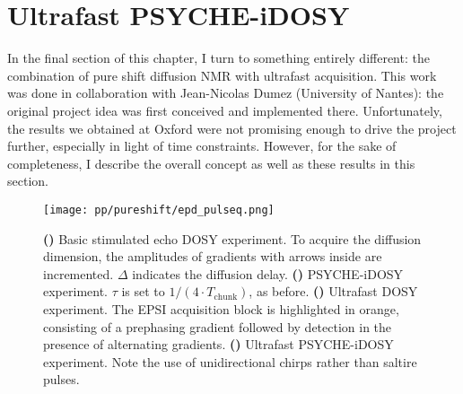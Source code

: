\section{Ultrafast PSYCHE-iDOSY}
\label{sec:pureshift__epsidosy}

In the final section of this chapter, I turn to something entirely different: the combination of pure shift diffusion NMR with ultrafast acquisition.
This work was done in collaboration with Jean-Nicolas Dumez (University of Nantes): the original project idea was first conceived and implemented there.
Unfortunately, the results we obtained at Oxford were not promising enough to drive the project further, especially in light of time constraints.
However, for the sake of completeness, I describe the overall concept as well as these results in this section.

\begin{figure}[htb]
    \centering
    \texttt{[image: pp/pureshift/epd\_pulseq.png]}%
    {\label{fig:epd_pulseq_stedosy}}%
    {\label{fig:epd_pulseq_psychedosy}}%
    {\label{fig:epd_pulseq_epsidosy}}%
    {\label{fig:epd_pulseq_epsipsychedosy}}%
    \caption[EPSI PSYCHE-iDOSY and associated pulse sequences]{
        \textbf{()} Basic stimulated echo DOSY experiment.
        To acquire the diffusion dimension, the amplitudes of gradients with arrows inside are incremented.
        $\Delta$ indicates the diffusion delay.
        \textbf{()} PSYCHE-iDOSY experiment. $\tau$ is set to $1/(4 \cdot T_\text{chunk})$, as before.
        \textbf{()} Ultrafast DOSY experiment. The EPSI acquisition block is highlighted in orange, consisting of a prephasing gradient followed by detection in the presence of alternating gradients.
        \textbf{()} Ultrafast PSYCHE-iDOSY experiment. Note the use of unidirectional chirps rather than saltire pulses.
    }
    \label{fig:epd_pulseq}
\end{figure}

